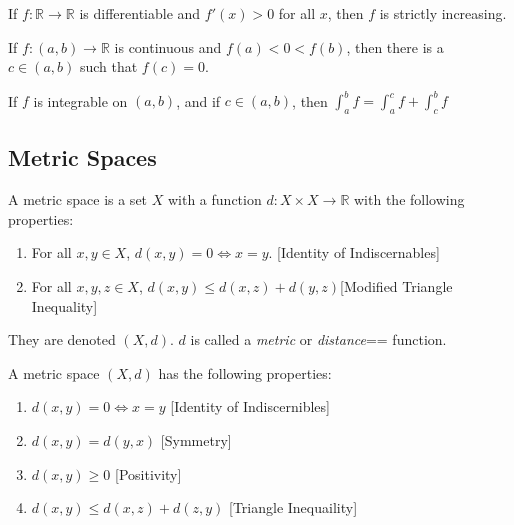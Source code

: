 \documentclass[crop=false,class=book,oneside]{standalone}
\begin{document}
    \begin{theorem*}
        If $f:\mathbb{R}\rightarrow \mathbb{R}$
        is differentiable
        and $f'(x)>0$ for all $x$,
        then $f$ is strictly increasing.
    \end{theorem*}
    \begin{theorem*}
        If $f:(a,b)\rightarrow\mathbb{R}$ is continuous and
        $f(a)<0<f(b)$, then there is a $c\in (a,b)$ such that
        $f(c)=0$.
    \end{theorem*}
    \begin{theorem*}
        If $f$ is integrable on $(a,b)$, and if $c\in(a,b)$, then
        $\int_{a}^{b}f=\int_{a}^{c}f+\int_{c}^{b}f$
    \end{theorem*}
        \subsection{Metric Spaces}
            \begin{definition}
            A metric space is a set $X$ with a function $d:X\times X\rightarrow \mathbb{R}$ with the following properties:
            \begin{enumerate}
            \item For all $x,y\in X$, $d(x,y) = 0\Leftrightarrow x=y$. \hfill [Identity of Indiscernables]
            \item For all $x,y,z\in X$, $d(x,y) \leq d(x,z)+d(y,z)$\hfill [Modified Triangle Inequality]
            \end{enumerate}
            They are denoted $(X,d)$. $d$ is called a
            \textit{metric} or \textit{distance}== function.
            \end{definition}
            \begin{theorem}
            A metric space $(X,d)$ has the following properties:
            \begin{enumerate}
                \item $d(x,y) = 0 \Leftrightarrow x=y$ \hfill [Identity of Indiscernibles]
                \item $d(x,y) = d(y,x)$ \hfill [Symmetry]
                \item $d(x,y) \geq 0$ \hfill [Positivity]
                \item $d(x,y) \leq d(x,z)+d(z,y)$ \hfill [Triangle Inequaility]
            \end{enumerate}
            \end{theorem}
\end{document}
